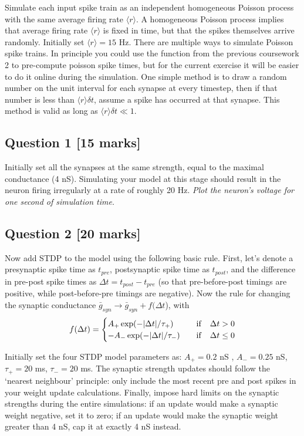 \documentclass[12pt]{article}
\begin{document}
Simulate each input spike train as an independent homogeneous Poisson
process with the same average firing rate $\langle r\rangle$. A homogeneous
Poisson process implies that average firing rate $\langle r\rangle$
is fixed in time, but that the spikes themselves arrive randomly.
Initially set $\langle r\rangle=15$ Hz. There are multiple ways to
simulate Poisson spike trains. In principle you could use the function from the previous coursework 2 to pre-compute poisson spike times, but for the current exercise it will be easier to do it online during the simulation. One simple method is
to draw a random number on the unit interval for each synapse at every
timestep, then if that number is less than $\langle r\rangle\delta t$,
assume a spike has occurred at that synapse. This method is valid as
long as $\langle r\rangle\delta t\ll1$.

\subsection*{Question 1 [15 marks]}
Initially set all the synapses at the same strength, equal to the maximal conductance (4 nS). Simulating your model at this stage should result in the neuron firing irregularly at a rate of roughly 20 Hz. \emph{Plot the neuron's voltage for one second of simulation time.}


\subsection*{Question 2 [20 marks]}
Now add STDP to the model using the following basic rule. First, let's denote
a presynaptic spike time as $t_{pre}$, postsynaptic spike time as
$t_{post}$, and the difference in pre-post spike times as $\Delta t=t_{post}-t_{pre}$
(so that pre-before-post timings are positive, while post-before-pre
timings are negative). Now the rule for changing the synaptic conductance
$\bar{g}_{syn}\rightarrow\bar{g}_{syn}+f(\Delta t$), with 
\[
f(\Delta t)=
\begin{cases} A_{+}\exp(-|\Delta t|/\tau_{+})  \quad  &{\rm if} \quad \Delta t>0 \cr
-A_{-}\exp(-|\Delta t|/\tau_{-}) \quad  &{\rm if}\quad \Delta t\leq0 \cr
\end{cases}
\]

Initially set the four STDP model parameters as: $A_{+}=0.2$ nS ,
$A_{-}=0.25$ nS, $\tau_{+}=20$ ms, $\tau_{-}=20$ ms. The synaptic
strength updates should follow the `nearest neighbour' principle:
only include the most recent pre and post spikes in your weight update
calculations. Finally, impose hard limits on the synaptic strengths
during the entire simulations: if an update would make a synaptic
weight negative, set it to zero; if an update would make the synaptic
weight greater than 4 nS, cap it at exactly 4 nS instead.
\end{document}

